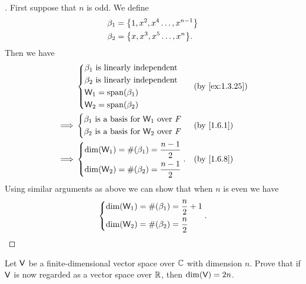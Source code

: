 \begin{proof}[]
  First suppose that \(n\) is odd.
  We define
  \begin{align*}
    \beta_1 & = \set{1, x^2, x^4 \dots, x^{n - 1}} \\
    \beta_2 & = \set{x, x^3, x^5 \dots, x^n}.
  \end{align*}
  Then we have
  \begin{align*}
             & \begin{dcases}
      \beta_1 \text{ is linearly independent} \\
      \beta_2 \text{ is linearly independent} \\
      \W_1 = \spn{\beta_1}                    \\
      \W_2 = \spn{\beta_2}
    \end{dcases}  &  & \text{(by \cref{ex:1.3.25})} \\
    \implies & \begin{dcases}
      \beta_1 \text{ is a basis for } \W_1 \text{ over } \F \\
      \beta_2 \text{ is a basis for } \W_2 \text{ over } \F
    \end{dcases}  &  & \text{(by \cref{1.6.1})}     \\
    \implies & \begin{dcases}
      \dim(\W_1) = \#(\beta_1) = \frac{n - 1}{2} \\
      \dim(\W_2) = \#(\beta_2) = \frac{n - 1}{2}
    \end{dcases}. &  & \text{(by \cref{1.6.8})}
  \end{align*}
  Using similar arguments as above we can show that when \(n\) is even we have
  \[
    \begin{dcases}
      \dim(\mathsf{W}_1) = \#(\beta_1) = \frac{n}{2} + 1 \\
      \dim(\mathsf{W}_2) = \#(\beta_2) = \frac{n}{2}
    \end{dcases}.
  \]
\end{proof}

\begin{ex}\label{ex:1.6.28}
  Let \(\mathsf{V}\) be a finite-dimensional vector space over \(\mathbb{C}\) with dimension \(n\).
  Prove that if \(\mathsf{V}\) is now regarded as a vector space over \(\mathbb{R}\), then \(\dim(\mathsf{V}) = 2n\).
\end{ex}

